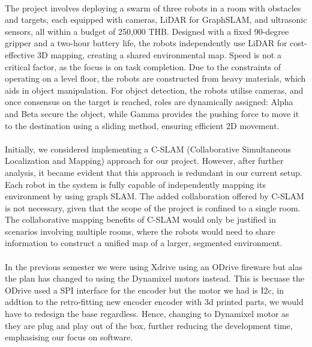 \paragraph*{}
The project involves deploying a swarm of three robots in a room with obstacles and targets, each equipped with cameras, LiDAR for GraphSLAM, and ultrasonic sensors, all within a budget of 250,000 THB. Designed with a fixed 90-degree gripper and a two-hour battery life, the robots independently use LiDAR for cost-effective 3D mapping, creating a shared environmental map. Speed is not a critical factor, as the focus is on task completion. Due to the constraints of operating on a level floor, the robots are constructed from heavy materials, which aids in object manipulation. For object detection, the robots utilise cameras, and once consensus on the target is reached, roles are dynamically assigned: Alpha and Beta secure the object, while Gamma provides the pushing force to move it to the destination using a sliding method, ensuring efficient 2D movement.

\paragraph*{}
Initially, we considered implementing a C-SLAM (Collaborative Simultaneous Localization and Mapping) approach for our project. However, after further analysis, it became evident that this approach is redundant in our current setup. Each robot in the system is fully capable of independently mapping its environment by using graph SLAM. The added collaboration offered by C-SLAM is not necessary, given that the scope of the project is confined to a single room. The collaborative mapping benefits of C-SLAM would only be justified in scenarios involving multiple rooms, where the robots would need to share information to construct a unified map of a larger, segmented environment.

\paragraph*{}
In the previous semester we were using Xdrive using an ODrive fireware but alas the plan has changed to using the Dynamixel motors instead. This is becuase the ODrive used a SPI interface for the encoder but the motor we had is I2c, in addtion to the retro-fitting new encoder encoder with 3d printed parts, we would have to redesign the base regardless. Hence, changing to Dynamixel motor as they are plug and play out of the box, further reducing the development time, emphasising our focus on software.